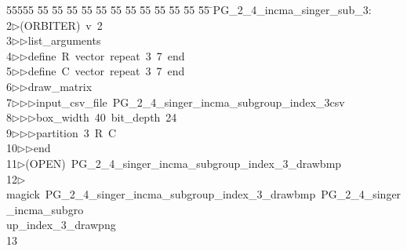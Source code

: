 %
%
\begin{tabbing}
55555 \= 55 \= 55 \= 55 \= 55 \= 55 \= 55 \= 55 \= 55 \= 55 \= 55 \= 55 \= 55 \= \>PG\_2\_4\_incma\_singer\_sub\_3:\\[0pt]
2\>$\triangleright$\>(ORBITER)\ v\ 2\ \\[0pt]
3\>$\triangleright$\>$\triangleright$\>list\_arguments\ \\[0pt]
4\>$\triangleright$\>$\triangleright$\>define\ R\ vector\ repeat\ 3\ 7\ end\ \\[0pt]
5\>$\triangleright$\>$\triangleright$\>define\ C\ vector\ repeat\ 3\ 7\ end\ \\[0pt]
6\>$\triangleright$\>$\triangleright$\>draw\_matrix\ \\[0pt]
7\>$\triangleright$\>$\triangleright$\>$\triangleright$\>input\_csv\_file\ PG\_2\_4\_singer\_incma\_subgroup\_index\_3csv\ \\[0pt]
8\>$\triangleright$\>$\triangleright$\>$\triangleright$\>box\_width\ 40\ bit\_depth\ 24\ \\[0pt]
9\>$\triangleright$\>$\triangleright$\>$\triangleright$\>partition\ 3\ R\ C\ \\[0pt]
10\>$\triangleright$\>$\triangleright$\>end\\[0pt]
11\>$\triangleright$\>(OPEN)\ PG\_2\_4\_singer\_incma\_subgroup\_index\_3\_drawbmp\\[0pt]
12\>$\triangleright$\>magick\ PG\_2\_4\_singer\_incma\_subgroup\_index\_3\_drawbmp\ PG\_2\_4\_singer\_incma\_subgro\\[0pt]
\>up\_index\_3\_drawpng\\[0pt]
13\>\end{tabbing}
